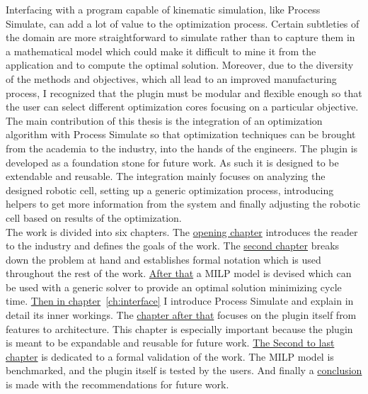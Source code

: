 Interfacing with a program capable of kinematic simulation, like Process Simulate, can add a lot of value to the optimization process. 
Certain subtleties of the domain are more straightforward to simulate rather than to capture them in a mathematical model which could make it difficult to mine it from the application and to compute the optimal solution. 
Moreover, due to the diversity of the methods and objectives, which all lead to an improved manufacturing process, I recognized that the plugin must be modular and flexible enough so that the user can select different optimization cores focusing on a particular objective. \\

The main contribution of this thesis is the integration of an optimization algorithm with Process Simulate so that optimization techniques can be brought from the academia to the industry, into the hands of the engineers. 
The plugin is developed as a foundation stone for future work. 
As such it is designed to be extendable and reusable. 
The integration mainly focuses on analyzing the designed robotic cell, setting up a generic optimization process, introducing helpers to get more information from the system and finally adjusting the robotic cell based on results of the optimization. \\

The work is divided into six chapters. The \href{ch:introduction}{opening chapter} introduces the reader to the industry and defines the goals of the work. The \href{ch:problem_statement}{second chapter} breaks down the problem at hand and establishes formal notation which is used throughout the rest of the work. \href{ch:milp_model}{After that} a MILP model is devised which can be used with a generic solver to provide an optimal solution minimizing cycle time. \href{ch:interface}{Then in chapter}~\ref{ch:interface} I introduce Process Simulate and explain in detail its inner workings. The \href{ch:integration}{chapter after that} focuses on the plugin itself from features to architecture. This chapter is especially important because the plugin is meant to be expandable and reusable for future work. \href{ch:experiments}{The Second to last chapter} is dedicated to a formal validation of the work. The MILP model is benchmarked, and the plugin itself is tested by the users. And finally a \href{ch:conclusion}{conclusion} is made with the recommendations for future work.    